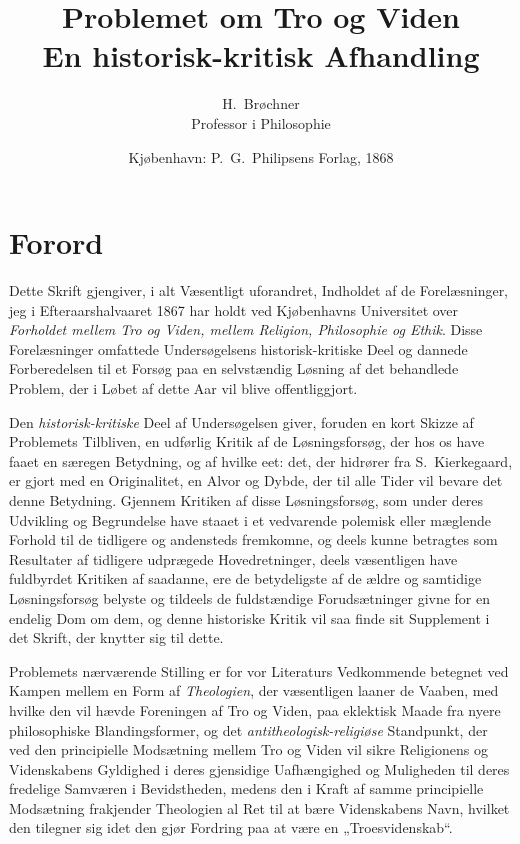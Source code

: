 \documentclass[12pt,a4paper]{book}
\title{\textbf{Problemet om Tro og Viden}\\[6pt]
  \large En historisk-kritisk Afhandling}
\author{H.\ Brøchner\\[4pt]
  \small Professor i Philosophie}
\date{Kjøbenhavn: P.\ G.\ Philipsens Forlag, 1868}
\newcommand{\opage}[1]{\marginnote{\footnotesize\textit{[#1]}}}
\begin{document}
\maketitle
\thispagestyle{empty}
\newpage

\tableofcontents
\newpage

\chapter*{Forord}
\label{ch:forord}

\noindent \opage{1}Dette Skrift gjengiver, i alt Væsentligt uforandret,
Indholdet af de Forelæsninger, jeg i Efteraarshalvaaret 1867 har holdt
ved Kjøbenhavns Universitet over \emph{Forholdet mellem Tro og Viden, mellem Religion, Philosophie og Ethik}. Disse Forelæsninger omfattede
Undersøgelsens historisk-kritiske Deel og dannede Forberedelsen til et
Forsøg paa en selvstændig Løsning af det behandlede Problem, der i
Løbet af dette Aar vil blive offentliggjort.

Den \emph{historisk-kritiske} Deel af Undersøgelsen giver, foruden en kort
Skizze af Problemets Tilbliven, en udførlig Kritik af de
Løsningsforsøg, der hos os have faaet en særegen Betydning, og af
hvilke eet: det, der hidrører fra S.\ Kierkegaard, er gjort med
en Originalitet, en Alvor og Dybde, der til alle Tider vil bevare det
denne Betydning. Gjennem Kritiken af disse Løsningsforsøg, som under
deres Udvikling og Begrundelse have staaet i et vedvarende polemisk
eller mæglende Forhold til de tidligere og andensteds fremkomne, og
deels kunne betragtes som Resultater af tidligere udprægede
Hovedretninger, deels væsentligen have fuldbyrdet Kritiken af
saadanne, ere de betydeligste af de ældre og samtidige Løsningsforsøg
belyste og tildeels de fuldstændige Forudsætninger givne for en endelig
Dom om dem, og denne historiske Kritik vil saa finde sit Supplement i
det Skrift, der knytter sig til dette.

Problemets nærværende Stilling er for vor Literaturs Vedkommende
betegnet ved Kampen mellem en Form af \emph{Theologien}, der væsentligen
laaner de Vaaben, med hvilke den vil hævde Foreningen af Tro og Viden,
paa \opage{2}eklektisk Maade fra nyere philosophiske Blandingsformer, og det \emph{antitheologisk-religiøse} Standpunkt, der ved den principielle
Modsætning mellem Tro og Viden vil sikre Religionens og Videnskabens
Gyldighed i deres gjensidige Uafhængighed og Muligheden til deres
fredelige Samværen i Bevidstheden, medens den i Kraft af samme
principielle Modsætning frakjender Theologien al Ret til at bære
Videnskabens Navn, hvilket den tilegner sig idet den gjør Fordring paa
at være en „Troesvidenskab“.
\end{document}
